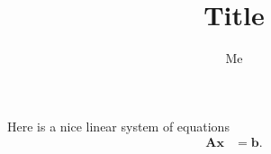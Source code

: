 \documentclass{simple-article}
\author{Me}
\title{Title}
\begin{document}
\maketitle
Here is a nice linear system of equations
\begin{align}
  \mathbf{A} \mathbf{x} & = \mathbf{b}.
\end{align}
\end{document}
